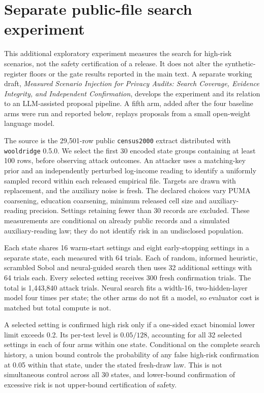 \section{Separate public-file search experiment}\label{sec:public-search}

This additional exploratory experiment measures the search for high-risk
scenarios, not the safety certification of a release. It does not alter the
synthetic-register floors or the gate results reported in the main text. A
separate working draft, \emph{Measured Scenario Injection for Privacy Audits:
Search Coverage, Evidence Integrity, and Independent Confirmation}, develops
the experiment and its relation to an LLM-assisted proposal pipeline. A
fifth arm, added after the four baseline arms were run and reported below,
replays proposals from a small open-weight language model.

The source is the 29,501-row public \texttt{census2000} extract distributed
with \texttt{wooldridge} 0.5.0. We select the first 30 encoded state groups
containing at least 100 rows, before observing attack outcomes. An attacker
uses a matching-key prior and an independently perturbed log-income reading
to identify a uniformly sampled record within each released empirical file.
Targets are drawn with replacement, and the auxiliary noise is fresh. The
declared choices vary PUMA coarsening, education coarsening, minimum released
cell size and auxiliary-reading precision. Settings retaining fewer than 30
records are excluded. These measurements are conditional on already public
records and a simulated auxiliary-reading law; they do not identify risk in
an undisclosed population.

Each state shares 16 warm-start settings and eight early-stopping settings
in a separate state, each measured with 64 trials. Each of random, informed
heuristic, scrambled Sobol and neural-guided search then uses 32 additional
settings with 64 trials each. Every selected setting receives 300 fresh
confirmation trials. The total is 1,443,840 attack trials. Neural search
fits a width-16, two-hidden-layer model four times per state; the other arms
do not fit a model, so evaluator cost is matched but total compute is not.

A selected setting is confirmed high risk only if a one-sided exact binomial
lower limit exceeds 0.2. Its per-test level is $0.05/128$, accounting for all
32 selected settings in each of four arms within one state. Conditional on
the complete search history, a union bound controls the probability of any
false high-risk confirmation at 0.05 within that state, under the stated
fresh-draw law. This is not simultaneous control across all 30 states, and
lower-bound confirmation of excessive risk is not upper-bound certification
of safety.

